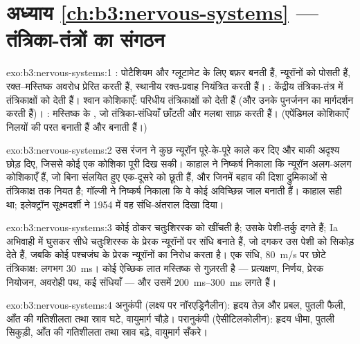 \section*{अध्याय \ref{ch:b3:nervous-systems} --- तंत्रिका-तंत्रों का संगठन}

\begin{solution}{exo:b3:nervous-systems:1}
: पोटैशियम और ग्लूटामेट के लिए बफ़र बनती हैं, न्यूरॉनों को
पोसती हैं, रक्त--मस्तिष्क अवरोध प्रेरित करती हैं, स्थानीय रक्त-प्रवाह
नियंत्रित करती हैं। : केंद्रीय तंत्रिका-तंत्र में
तंत्रिकाक्षों को  देती हैं। श्वान कोशिकाएँ: परिधीय तंत्रिकाक्षों
को  देती हैं (और उनके पुनर्जनन का मार्गदर्शन करती हैं)।
: मस्तिष्क के , जो तंत्रिका-संधियाँ छाँटती और
मलबा साफ़ करती हैं। (एपेंडिमल कोशिकाएँ निलयों की परत बनाती हैं और
 बनाती हैं।)
\end{solution}

\begin{solution}{exo:b3:nervous-systems:2}
उस रंजन ने कुछ न्यूरॉन पूरे-के-पूरे काले कर दिए और बाकी अदृश्य छोड़
दिए, जिससे कोई एक कोशिका पूरी दिख सकी। काहाल ने निष्कर्ष निकाला कि
न्यूरॉन अलग-अलग कोशिकाएँ हैं, जो बिना संलयित हुए एक-दूसरे को छूती हैं,
और जिनमें बहाव की दिशा द्रुमिकाओं से तंत्रिकाक्ष तक नियत है; गॉल्जी ने
निष्कर्ष निकाला कि वे कोई अविच्छिन्न जाल बनाती हैं। काहाल सही था;
इलेक्ट्रॉन सूक्ष्मदर्शी ने 1954 में वह संधि-अंतराल दिखा दिया।
\end{solution}

\begin{solution}{exo:b3:nervous-systems:3}
कोई ठोकर चतुःशिरस्क को खींचती है; उसके पेशी-तर्कु दगते हैं; Ia अभिवाही
 में घुसकर सीधे चतुःशिरस्क के प्रेरक न्यूरॉनों पर संधि बनाते
हैं, जो दगकर उस पेशी को सिकोड़ देते हैं, जबकि कोई  पश्चजंघ
के प्रेरक न्यूरॉनों का निरोध करता है। एक संधि, \qty{80}{m/s} पर छोटे
तंत्रिकाक्ष: लगभग \qty{30}{ms}। कोई ऐच्छिक लात मस्तिष्क से गुज़रती है
--- प्रत्यक्षण, निर्णय, प्रेरक नियोजन, अवरोही पथ, कई संधियाँ --- और
उसमें \qtyrange{200}{300}{ms} लगते हैं।
\end{solution}

\begin{solution}{exo:b3:nervous-systems:4}
अनुकंपी (लक्ष्य पर नॉरएड्रिनैलीन): हृदय तेज़ और प्रबल, पुतली फैली, आँत
की गतिशीलता तथा स्राव घटे, वायुमार्ग चौड़े। परानुकंपी (ऐसीटिलकोलीन):
हृदय धीमा, पुतली सिकुड़ी, आँत की गतिशीलता तथा स्राव बढ़े, वायुमार्ग
सँकरे।
\end{solution}

